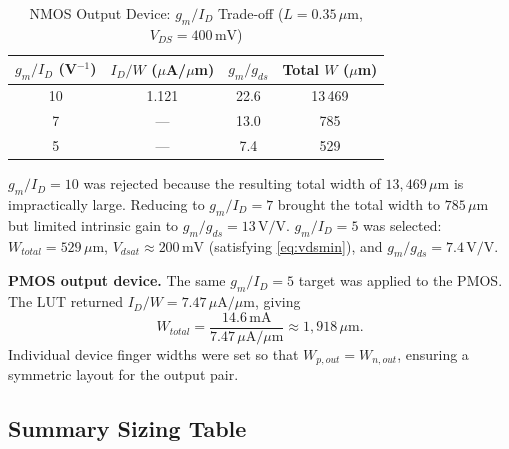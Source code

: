 \documentclass[conference]{IEEEtran}
\begin{document}
\begin{table}[htbp]
\caption{NMOS Output Device: $g_m/I_D$ Trade-off ($L = 0.35\,\mu$m, $V_{DS} = 400\,\text{mV}$)}
\begin{center}
\begin{tabular}{cccc}
\toprule
$g_m/I_D$ (V$^{-1}$) & $I_D/W$ ($\mu$A/$\mu$m) & $g_m/g_{ds}$ & Total $W$ ($\mu$m) \\
\midrule
10 & 1.121 & 22.6 & 13\,469 \\
 7 & ---   & 13.0 &    785  \\
 5 & ---   &  7.4 &    529  \\
\bottomrule
\end{tabular}
\label{tab:nmos_tradeoff}
\end{center}
\end{table}

$g_m/I_D = 10$ was rejected because the resulting total width of
$13{,}469\,\mu\text{m}$ is impractically large.  Reducing to $g_m/I_D = 7$
brought the total width to $785\,\mu\text{m}$ but limited intrinsic gain to
$g_m/g_{ds} = 13\,\text{V/V}$.  $g_m/I_D = 5$ was selected:
$W_{total} = 529\,\mu\text{m}$, $V_{dsat} \approx 200\,\text{mV}$
(satisfying \eqref{eq:vdsmin}), and $g_m/g_{ds} = 7.4\,\text{V/V}$.

\textbf{PMOS output device.}
The same $g_m/I_D = 5$ target was applied to the PMOS.  The LUT returned
$I_D/W = 7.47\,\mu\text{A}/\mu\text{m}$, giving
\begin{equation}
  W_{total} = \frac{14.6\,\text{mA}}{7.47\,\mu\text{A}/\mu\text{m}} \approx 1{,}918\,\mu\text{m}.
\end{equation}
Individual device finger widths were set so that $W_{p,out} = W_{n,out}$,
ensuring a symmetric layout for the output pair.

\subsection{Summary Sizing Table}
\end{document}
